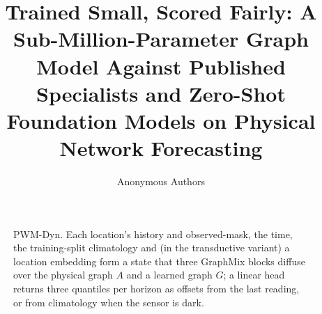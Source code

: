 \documentclass[sigconf,anonymous,review]{acmart}
\begin{document}
\title{Trained Small, Scored Fairly: A Sub-Million-Parameter Graph Model Against Published Specialists and
Zero-Shot Foundation Models on Physical Network Forecasting}

\author{Anonymous Authors}



\maketitle





\begin{figure}[t]
\centering
\resizebox{0.92\textwidth}{!}{}
\caption{PWM-Dyn. Each location's history and observed-mask, the time, the training-split climatology and (in the
transductive variant) a location embedding form a state that three GraphMix blocks diffuse over the physical
graph $A$ and a learned graph $G$; a linear head returns three quantiles per horizon as offsets from the last
reading, or from climatology when the sensor is dark.}
\label{fig:arch}
\end{figure}








\appendix

\end{document}

